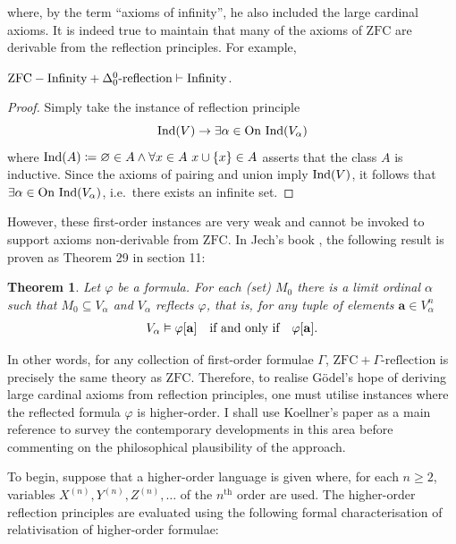 \documentclass[12pt]{article}
\theoremstyle{plain}
\newtheorem{theorem}{Theorem}[section]
\theoremstyle{definition}
\newcommand{\ZFC}{\mathrm{ZFC}}
\newcommand{\On}{\mathrm{On}}
\DeclareMathOperator{\Ind}{Ind}
\begin{document}
where, by the term ``axioms of infinity'', he also included the large cardinal axioms. It is indeed true to maintain that many of the axioms of $\ZFC$ are derivable from the reflection principles. For example,

\begin{proposition}
	$\ZFC - \textup{Infinity} + \textup{$\Delta^0_0$-reflection} \vdash \textup{Infinity}$.
\end{proposition}

\begin{proof}
	Simply take the instance of reflection principle
	\[\Ind\mleft(V\mright) \rightarrow \exists \alpha \in \On \, \Ind\mleft(V_\alpha\mright)\]
	where $\Ind\mleft(A\mright) \coloneqq \varnothing \in A \land \forall x \in A \ x \cup \left\{x\right\} \in A$ asserts that the class $A$ is inductive. Since the axioms of pairing and union imply $\Ind\mleft(V\mright)$, it follows that $\exists \alpha \in \On \, \Ind\mleft(V_\alpha\mright)$, i.e.\ there exists an infinite set.
\end{proof}

However, these first-order instances are very weak and cannot be invoked to support axioms non-derivable from $\ZFC$. In Jech's book \cite{jech-set-theory}, the following result is proven as Theorem 29 in section 11:

\begin{theorem}
	Let $\varphi$ be a formula. For each (set) $M_0$ there is a limit ordinal $\alpha$ such that $M_0 \subseteq V_\alpha$ and $V_\alpha$ reflects $\varphi$, that is, for any tuple of elements $\mathbf{a} \in V_\alpha^n$
	\[V_\alpha \vDash \varphi\mleft[\mathbf{a}\mright] \quad \text{if and only if} \quad \varphi\mleft[\mathbf{a}\mright].\]
\end{theorem}

In other words, for any collection of first-order formulae $\Gamma$, $\ZFC + \text{$\Gamma$-reflection}$ is precisely the same theory as $\ZFC$. Therefore, to realise G\"odel's hope of deriving large cardinal axioms from reflection principles, one must utilise instances where the reflected formula $\varphi$ is higher-order. I shall use Koellner's paper \cite{reflection-principles} as a main reference to survey the contemporary developments in this area before commenting on the philosophical plausibility of the approach.

To begin, suppose that a higher-order language is given where, for each $n \geq 2$, variables $X^{(n)}, Y^{(n)}, Z^{(n)}, \ldots$ of the $n^\text{th}$ order are used. The higher-order reflection principles are evaluated using the following formal characterisation of relativisation of higher-order formulae:
\end{document}
